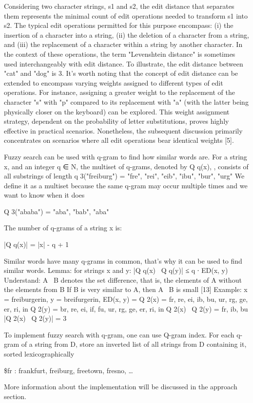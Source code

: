 Considering two character strings, s1 and s2, the edit distance that separates them represents the minimal count of edit operations needed to transform s1 into s2. The typical edit operations permitted for this purpose encompass: (i) the insertion of a character into a string, (ii) the deletion of a character from a string, and (iii) the replacement of a character within a string by another character. In the context of these operations, the term "Levenshtein distance" is sometimes used interchangeably with edit distance. To illustrate, the edit distance between "cat" and "dog" is 3. It's worth noting that the concept of edit distance can be extended to encompass varying weights assigned to different types of edit operations. For instance, assigning a greater weight to the replacement of the character "s" with "p" compared to its replacement with "a" (with the latter being physically closer on the keyboard) can be explored. This weight assignment strategy, dependent on the probability of letter substitutions, proves highly effective in practical scenarios. Nonetheless, the subsequent discussion primarily concentrates on scenarios where all edit operations bear identical weights [5].

Fuzzy search can be used with q-gram to find how similar words are.  For a string x, and an integer q ∈ N, the multiset of q-grams, denoted by Q q(x), , consists of all substrings of length q 3("freiburg") = { "fre", "rei", "eib", "ibu", "bur", "urg" }
We define it as a multiset because the same q-gram may occur multiple times and we want to know when it does 

Q 3("ababa") = { "aba", "bab", "aba" }

The number of q-grams of a string x is:

|Q q(x)| = |x| - q + 1

Similar words have many q-grams in common, that's why it can be used to find similar words. 
Lemma: for strings x and y: |Q q(x) \ Q q(y)| ≤ q ∙ ED(x, y)
Understand: A \ B denotes the set difference, that is, the elements of A without the elements from B If B is very similar to A, then A \ B is small [13]
Example:
x = freiburgerin, y = breifurgerin, ED(x, y) = Q 2(x) = { fr, re, ei, ib, bu, ur, rg, ge, er, ri, in } Q 2(y) = { br, re, ei, if, fu, ur, rg, ge, er, ri, in } 
Q 2(x) \ Q 2(y) = {fr, ib, bu}
|Q 2(x) \ Q 2(y)| = 3

To implement fuzzy search with q-gram, one can use Q-gram index. For each q-gram of a string from D, store an inverted list of all strings from D containing it, sorted lexicographically

\$fr : frankfurt, freiburg, freetown, fresno, …

More information about the implementation will be discussed in the approach section.

